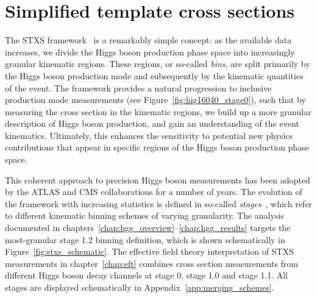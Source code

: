 \section{Simplified template cross sections}\label{sec:theory_stxs}
The STXS framework~\cite{deFlorian:2016spz} is a remarkably simple concept: as the available data increases, we divide the Higgs boson production phase space into increasingly granular kinematic regions. These regions, or so-called \textit{bins}, are split primarily by the Higgs boson production mode and subsequently by the kinematic quantities of the event. The framework provides a natural progression to inclusive production mode measurements (see Figure~\ref{fig:hig16040_stage0}), such that by measuring the cross section in the kinematic regions, we build up a more granular description of Higgs boson production, and gain an understanding of the event kinematics. Ultimately, this enhances the sensitivity to potential new physics contributions that appear in specific regions of the Higgs boson production phase space.

This coherent approach to precision Higgs boson measurements has been adopted by the ATLAS and CMS collaborations for a number of years. The evolution of the framework with increasing statistics is defined in so-called \textit{stages}~\cite{deFlorian:2016spz,Berger:2019wnu}, which refer to different kinematic binning schemes of varying granularity. The \Hgg analysis documented in chapters~\ref{chap:hgg_overview}--\ref{chap:hgg_results} targets the most-granular stage 1.2 binning definition, which is shown schematically in Figure~\ref{fig:stxs_schematic}. The effective field theory interpretation of STXS measurements in chapter~\ref{chap:eft} combines cross section measurements from different Higgs boson decay channels at stage 0, stage 1.0 and stage 1.1. All stages are displayed schematically in Appendix~\ref{app:merging_schemes}.

